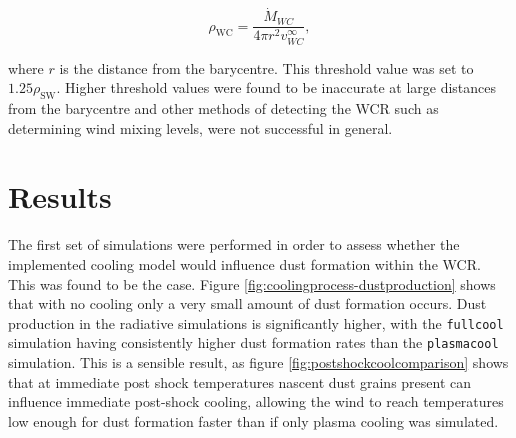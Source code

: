 \documentclass[fleqn,usenatbib]{mnras}
\begin{document}
\begin{equation}
  \rho_\text{WC} = \frac{\dot{M}_{WC}}{4 \pi r^2 v^\infty_{WC}},
\end{equation}

\noindent
where $r$ is the distance from the barycentre.
This threshold value was set to $1.25\rho_\text{SW}$.
Higher threshold values were found to be inaccurate at large distances from the barycentre and other methods of detecting the WCR such as determining wind mixing levels, were not successful in general.


\section{Results}
\label{sec:p1-results}

The first set of simulations were performed in order to assess whether the implemented cooling model would influence dust formation within the WCR.
This was found to be the case.
Figure \ref{fig:coolingprocess-dustproduction} shows that with no cooling only a very small amount of dust formation occurs.
Dust production in the radiative simulations is significantly higher, with the \texttt{fullcool} simulation having consistently higher dust formation rates than the \texttt{plasmacool} simulation.
This is a sensible result, as figure \ref{fig:postshockcoolcomparison} shows that at immediate post shock temperatures nascent dust grains present can influence immediate post-shock cooling, allowing the wind to reach temperatures low enough for dust formation faster than if only plasma cooling was simulated.
\end{document}
